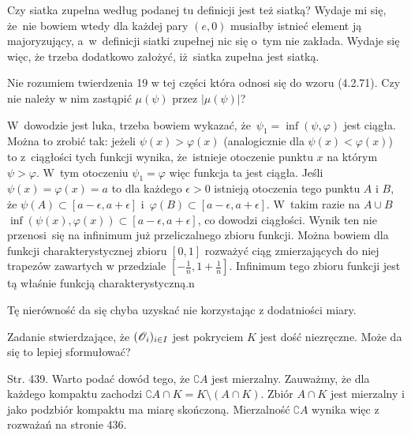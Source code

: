 \documentclass[a4paper,11pt]{article}
\begin{document}
\vspace{\spaceFour}


\start {} Czy siatka zupełna według podanej tu definicji jest
też siatką? Wydaje mi się, że~nie bowiem wtedy dla każdej pary
$(e, 0)$ musiałby istnieć element ją majoryzujący, a~w~definicji
siatki zupełnej nic się o~tym nie zakłada. Wydaje się więc, że trzeba
dodatkowo założyć, iż~siatka zupełna jest siatką.

\vspace{\spaceFour}


\start {} Nie rozumiem twierdzenia 19 w tej części która odnosi
się do wzoru (4.2.71). Czy nie należy w nim zastąpić $\mu( \psi )$
przez $| \mu( \psi ) |$?

\vspace{\spaceFour}


\start {} W~dowodzie jest luka, trzeba bowiem wykazać,
że~$\psi_{ 1 } = \inf( \psi, \varphi )$ jest ciągła. Można to zrobić
tak: jeżeli $\psi( x ) > \varphi( x )$ (analogicznie dla
$\psi( x ) < \varphi( x )$) to z~ciągłości tych funkcji wynika,
że~istnieje otoczenie punktu $x$ na którym $\psi > \varphi$. W~tym
otoczeniu $\psi_{ 1 } = \varphi$ więc funkcja ta jest ciągła. Jeśli
$\psi( x ) = \varphi( x ) = a$ to dla każdego $\epsilon > 0$ istnieją
otoczenia tego punktu $A$ i $B$, że
$\psi( A ) \subset [ a - \epsilon, a + \epsilon ]$
i~$\varphi( B ) \subset [ a - \epsilon, a + \epsilon ]$. W~takim razie
na $A \cup B$ $\inf( \psi( x ), \varphi( x ) ) \subset [ a - \epsilon, a + \epsilon ]$, co dowodzi ciągłości. Wynik ten nie przenosi~się na infinimum już
przeliczalnego zbioru funkcji. Można bowiem dla funkcji
charakterystycznej zbioru $[0, 1]$ rozważyć ciąg zmierzających do niej
trapezów zawartych w przedziale
$[-\frac{ 1 }{ n }, 1 + \frac{ 1 }{ n } ]$. Infinimum tego zbioru
funkcji jest tą właśnie funkcją charakterystyczną.n

\vspace{\spaceFour}


\start {} Tę nierówność da się chyba uzyskać nie korzystając z
dodatniości miary.

\vspace{\spaceFour}


\start {} Zadanie stwierdzające, że
$( \mathcal{O}_{ i } )_{ i \in I }$ jest pokryciem $K$ jest dość
niezręczne. Może da się to lepiej sformułować?

\start Str. 439. Warto
podać dowód tego, że $\complement A$ jest mierzalny. Zauważmy, że dla
każdego kompaktu zachodzi
$\complement A \cap K = K \setminus ( A \cap K )$. Zbiór $A \cap K$
jest mierzalny i jako podzbiór kompaktu ma miarę skończoną.
Mierzalność $\complement A$ wynika więc z rozważań na stronie 436.
\end{document}
